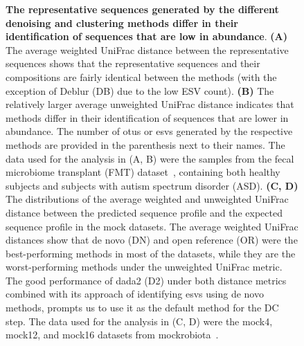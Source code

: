   \begin{figure}[H]
    \centering
    \caption{
      \textbf{The representative sequences generated by the different denoising and clustering methods differ in their identification of sequences that are low in abundance}.
      \textbf{(A)} The average weighted UniFrac distance between the representative sequences shows that the representative sequences and their compositions are fairly identical between the methods (with the exception of Deblur (DB) due to the low ESV count).
      \textbf{(B)} The relatively larger average unweighted UniFrac distance indicates that methods differ in their identification of sequences that are lower in abundance.
      The number of \ac{otu}s or \ac{esv}s generated by the respective methods are provided in the parenthesis next to their names.
      The data used for the analysis in (A, B) were the samples from the fecal microbiome transplant (FMT) dataset~\cite{Kang2017}, containing both healthy subjects and subjects with autism spectrum disorder (ASD).
      \textbf{(C, D)} The distributions of the average weighted and unweighted UniFrac distance between the predicted sequence profile and the expected sequence profile in the mock datasets.
      The average weighted UniFrac distances show that de novo (DN) and open reference (OR) were the best-performing methods in most of the datasets, while they are the worst-performing methods under the unweighted UniFrac metric.
      The good performance of dada2 (D2) under both distance metrics combined with its approach of identifying \ac{esv}s using de novo methods, prompts us to use it as the default method for the DC step.
      The data used for the analysis in (C, D) were the mock4, mock12, and mock16 datasets from mockrobiota~\cite{Bokulich2016}.
    }
    \label{fig:figure2}
  \end{figure}


